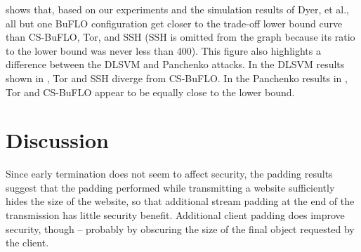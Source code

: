 \documentclass[10pt,journal]{IEEEtran}
\newcommand{\buflo} {BuFLO\xspace}
\newcommand{\csb} {CS-BuFLO\xspace}
\begin{document}
 shows that, based on our experiments
and the simulation results of Dyer, et al., all but one \buflo
configuration get closer to the trade-off lower bound curve than \csb,
Tor, and SSH (SSH is omitted from the graph because its ratio to the
lower bound was never less than 400).  This figure also highlights a
difference between the DLSVM and Panchenko attacks.  In the DLSVM
results shown in , Tor and SSH diverge from
\csb.  In the Panchenko results in , Tor
and \csb appear to be equally close to the lower bound.

\begin{figure*}[t]
  \centering
  
  


  \caption{\label{fig:all-attacks-tradeoff-various} Non-uniform lower
    bounds on bandwidth ratio, as a function of the security
    parameter, $\epsilon$, and specific trade-off points of the
    systems evaluated.  The \buflo results are taken from Dyer, et
    al.~\cite{dyer-snp12}, and therefore use $n=128$.  SSH is omitted
    from  because its ratio to the lower
    bound was always greater than 400.}
\end{figure*}





\section{Discussion}
\label{sec:discussion}

Since early termination does not seem to affect security, the padding results
suggest that the padding performed while transmitting a website
sufficiently hides the size of the website, so that additional stream
padding at the end of the transmission has little security benefit.
Additional client padding does improve security, though -- probably by
obscuring the size of the final object requested by the client.
\end{document}

